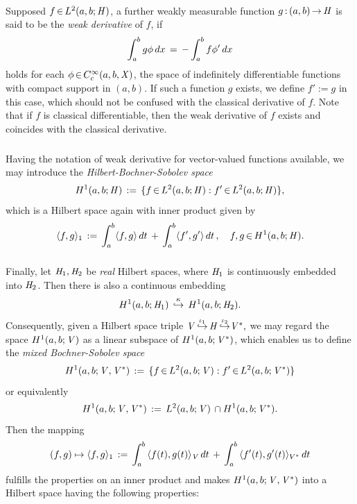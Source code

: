 \documentclass[11pt,twoside]{article}
\begin{document}
\paragraph{} %
Supposed $f \xeof L^2(a,b;\hilH)$,
a further weakly measurable function $g \: (a,b) \xto \hilH$
is said to be the \textit{weak derivative} of $f$,
if
\[
\int_a^b g \phi \,dx \= - \int_a^b f \phi' \,dx
\]
holds for each $\phi \xeof C_c^{\infty}(a,b,\banX)$,
the space of indefinitely differentiable functions
with compact support in $(a,b)$.
If such a function $g$ exists,
we define $f' := g$ in this case,
which should not be confused with the classical derivative of $f$.
Note that
if $f$ is classical differentiable,
then the weak derivative of $f$ exists and coincides
with the classical derivative.

\subparagraph{} %
Having the notation of weak derivative for vector-valued functions available,
we may introduce the \textit{Hilbert-Bochner-Sobolev space}
\[
H^1(a,b;\hilH) \eqdef
\{f \xeof L^2(a,b;\hilH): f' \xeof L^2(a,b;\hilH) \},
\]
which is a Hilbert space again with inner product given by
\[
\scalar{f}{g}_1 \eqdef \int_a^b \scalar{f}{g} \, dt
\+
\int_a^b \scalar{f'}{g'} \, dt\,,
\quad f,g \xeof H^1(a,b;\hilH).
\]

\subparagraph{} %
Finally,
let $\hilH_1, \hilH_2$ be \textit{real} Hilbert spaces,
where $\hilH_1$ is continuously embedded into $\hilH_2$.
Then there is also a continuous embedding
\[
H^1(a,b;\hilH_1) \, \overset{\kappa}{\hookrightarrow} \, H^1(a,b;\hilH_2).
\]
Consequently,
given a Hilbert space triple 
$
\vecV \, {\overset{\iota_1}{\hookrightarrow}} \,
\hilH \, {\overset{\iota_2}{\hookrightarrow}} \vecV^*,
$
we may regard the space $H^1(a,b;\vecV)$
as a linear subspace of $H^1(a,b;\vecV^*)$,
which enables us to define the \textit{mixed Bochner-Sobolev space}
\[
H^1(a,b;\vecV,\vecV^*) \eqdef
\{ f \xeof L^2(a,b;\vecV): f' \xeof L^2(a,b;\vecV^*) \}
\]
or equivalently
\[
H^1(a,b;\vecV,\vecV^*) \eqdef L^2(a,b;\vecV) \, \cap H^1(a,b;\vecV^*).
\]
Then the mapping
\[
(f,g) \mapsto \scalar{f}{g}_1 \eqdef
\int_a^b \, \scalar{f(t)}{g(t)}_{\vecV} \, dt
\+
\int_a^b \, \scalar{f'(t)}{g'(t)}_{V^*} \, dt
\]
fulfills the properties on an inner product
and makes $H^1(a,b;\vecV,\vecV^*)$ into a Hilbert space
having the following properties:
\end{document}
